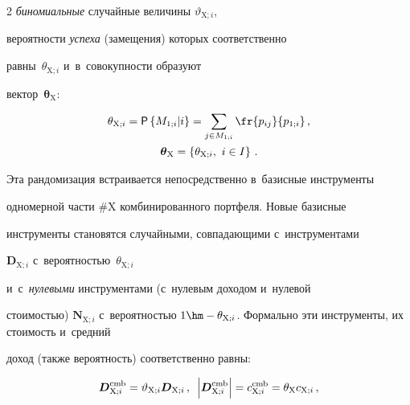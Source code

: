 \begin{multicols}{2}
\textit{биномиальные} случайные величины $\vartheta_{\mathrm{X};i}$, 


вероятности \textit{успеха} (замещения) которых соответственно 


равны~$\theta_{\mathrm{X};i}$ и~в~совокупности образуют 


вектор~$\boldsymbol{\theta}_{\mathrm{X}}$:


  \begin{multline}


   \theta_{\mathrm{X};i} = {\sf P}\left\{ 


  M_{1;i}\vert i\right\} =\sum\limits_{j\in 


M_{1;i}} \fr{p_{ij}}{p_{1;i}}\,,\\


 \boldsymbol{\theta}_{\mathrm{X}}=\left\{ 


\theta_{\mathrm{X};i},\ i\in I\right\}\,.


  \label{e11-ags}


  \end{multline}


  


  Эта рандомизация встраивается непосредственно в~базисные инструменты 


одномерной части \#X комбинированного портфеля. Новые базисные 


инструменты становятся случайными, совпадающими с~инструментами 


$\boldsymbol{D}_{\mathrm{X};i}$ с~вероятностью~$\theta_{\mathrm{X};i}$ 


и~с~\textit{нулевыми} инструментами (с~нулевым доходом и~нулевой 


стоимостью) $\boldsymbol{N}_{\mathrm{X};i}$ с~вероятностью $1\hm- 


\theta_{\mathrm{X};i}$. Формально эти инструменты, их стоимость и~средний 


доход (также вероятность) соответственно равны: 


  \begin{multline}


   \boldsymbol{D}_{\mathrm{X};i}^{\mathrm{cmb}}=\vartheta_{\mathrm{X};i} 


\boldsymbol{D}_{\mathrm{X};i}\,,\enskip


  \left\vert  \boldsymbol{D}^{\mathrm{cmb}}_{\mathrm{X};i}\right\vert= 


c^{\mathrm{cmb}}_{\mathrm{X};i}=\theta_{\mathrm{X}} c_{\mathrm{X};i}\,,\\



\end{multline}
\end{multicols}
